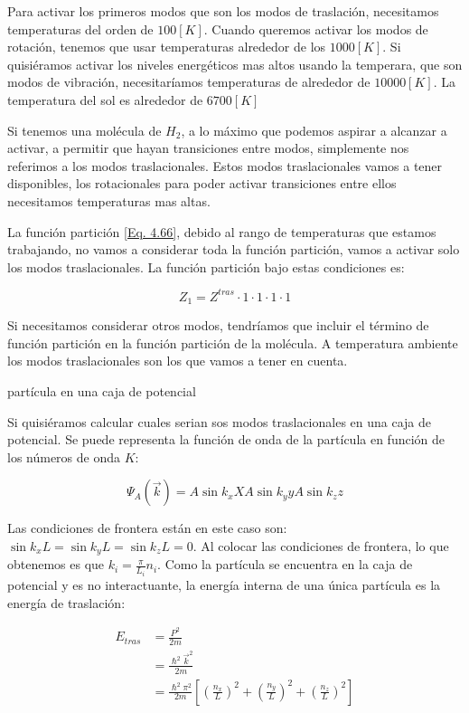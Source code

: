 \documentclass[11pt,fleqn]{book}
\begin{document}


Para activar los primeros modos que son los modos de traslación, necesitamos temperaturas del orden de $100[K]$. Cuando queremos activar los modos de rotación, tenemos que usar temperaturas alrededor de los $1000[K]$. Si quisiéramos activar los niveles energéticos mas altos usando la temperara, que son modos de vibración, necesitaríamos temperaturas de alrededor de $10000[K]$. La temperatura del sol es alrededor de $6700 [K]$

Si tenemos una molécula de $H_{2}$, a lo máximo que podemos aspirar a alcanzar a activar, a permitir que hayan transiciones entre modos, simplemente nos referimos a los modos traslacionales. Estos modos traslacionales vamos a tener disponibles, los rotacionales para poder activar transiciones entre ellos necesitamos temperaturas mas altas. 

La función partición \ref{Eq. 4.66}, debido al rango de temperaturas que estamos trabajando, no vamos a considerar toda la función partición, vamos a activar solo los modos traslacionales. La función partición bajo estas condiciones es:
 

\begin{equation}
    Z_{1}=Z^{tras}\cdot1\cdot1\cdot1\cdot1
    \label{Eq. 4.67}
\end{equation}

Si necesitamos considerar otros modos, tendríamos que incluir el término de función partición en la función partición de la molécula. A temperatura ambiente los modos traslacionales son los que vamos a tener en cuenta.


\begin{example}{partícula en una caja de potencial}

Si quisiéramos calcular cuales serian sos modos traslacionales en una caja de potencial. Se puede representa la función de onda de la partícula en función de los números de onda $K$:

\begin{equation*}
    \Psi_{A}(\Vec{k})=A\sin{k_{x}X}A\sin{k_{y}y}A\sin{k_{z}z}
\end{equation*}



Las condiciones de frontera están en este caso son: $\sin{k_{x}L}=\sin{k_{y}L}=\sin{k_{z}L}=0$. Al colocar las condiciones de frontera, lo que obtenemos es que $k_{i}=\frac{\pi}{L_{i}}n_{i}$. Como la partícula se encuentra en la caja de potencial y es no interactuante, la energía interna de una única partícula es la energía de traslación:

\begin{equation*}
\begin{split}
    E_{tras}&=\frac{P^{2}}{2m}\\
    &=\frac{\hslash^{2}\vec{k}^{2}}{2m}\\
    &=\frac{\hslash^{2}\pi^{2}}{2m}\left[\left(\frac{n_{x}}{L}\right)^{2}+\left(\frac{n_{y}}{L}\right)^{2}+\left(\frac{n_{z}}{L}\right)^{2}\right]
\end{split}
\end{equation*}
\end{example}
\end{document}
